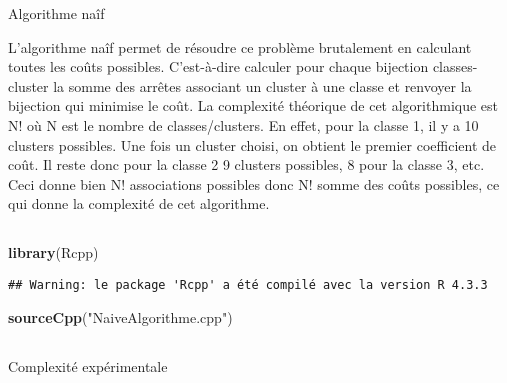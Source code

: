 \documentclass[
]{article}
\newenvironment{Shaded}{\begin{snugshade}}{\end{snugshade}}
\newcommand{\FunctionTok}[1]{\textcolor[rgb]{0.13,0.29,0.53}{\textbf{#1}}}
\newcommand{\NormalTok}[1]{#1}
\newcommand{\StringTok}[1]{\textcolor[rgb]{0.31,0.60,0.02}{#1}}
\begin{document}
Algorithme naîf

L'algorithme naîf permet de résoudre ce problème brutalement en
calculant toutes les coûts possibles. C'est-à-dire calculer pour chaque
bijection classes-cluster la somme des arrêtes associant un cluster à
une classe et renvoyer la bijection qui minimise le coût. La complexité
théorique de cet algorithmique est N! où N est le nombre de
classes/clusters. En effet, pour la classe 1, il y a 10 clusters
possibles. Une fois un cluster choisi, on obtient le premier coefficient
de coût. Il reste donc pour la classe 2 9 clusters possibles, 8 pour la
classe 3, etc. Ceci donne bien N! associations possibles donc N! somme
des coûts possibles, ce qui donne la complexité de cet algorithme.

\hypertarget{section-10}{%
\subsection{}\label{section-10}}

\begin{Shaded}
\begin{Highlighting}[]
\FunctionTok{library}\NormalTok{(Rcpp)}
\end{Highlighting}
\end{Shaded}

\begin{verbatim}
## Warning: le package 'Rcpp' a été compilé avec la version R 4.3.3
\end{verbatim}

\begin{Shaded}
\begin{Highlighting}[]
\FunctionTok{sourceCpp}\NormalTok{(}\StringTok{"NaiveAlgorithme.cpp"}\NormalTok{)}
\end{Highlighting}
\end{Shaded}

\hypertarget{section-11}{%
\subsection{}\label{section-11}}

Complexité expérimentale
\end{document}
